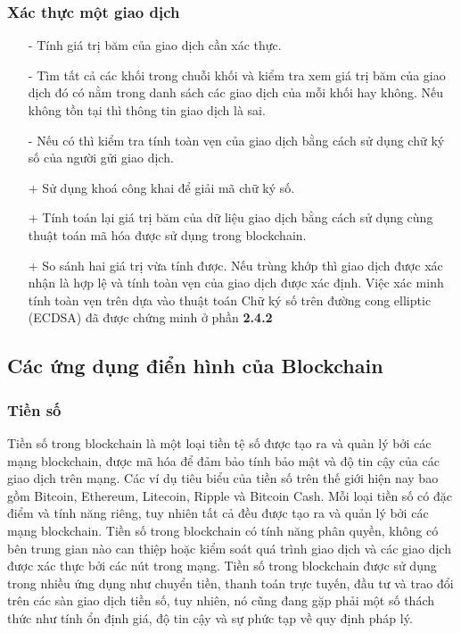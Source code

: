 \subsubsection{Xác thực một giao dịch}
\begin{itemize}
    \item[-] Tính giá trị băm của giao dịch cần xác thực.
    \item[-] Tìm tất cả các khối trong chuỗi khối và kiểm tra xem giá trị băm của giao 
    dịch đó có nằm trong danh sách các giao dịch của mỗi khối hay không.
    Nếu không tồn tại thì thông tin giao dịch là sai.
    \item[-] Nếu có thì kiểm tra tính toàn vẹn của giao dịch bằng cách sử dụng chữ ký số 
    của người gửi giao dịch.
        \item[+] Sử dụng khoá công khai để giải mã chữ ký số.
        \item[+] Tính toán lại giá trị băm của dữ liệu giao dịch bằng cách sử dụng cùng
        thuật toán mã hóa được sử dụng trong blockchain.
        \item[+] So sánh hai giá trị vừa tính được. Nếu trùng khớp thì giao dịch được
        xác nhận là hợp lệ và tính toàn vẹn của giao dịch được xác định.
        Việc xác minh tính toàn vẹn trên dựa vào thuật toán Chữ ký số trên đường cong 
        elliptic (ECDSA) đã được chứng minh ở phần \textbf{2.4.2}
\end{itemize}

\subsection{Các ứng dụng điển hình của Blockchain}
\subsubsection{Tiền số}

Tiền số trong blockchain là một loại tiền tệ số được tạo ra và quản lý bởi các 
mạng blockchain, được mã hóa để đảm bảo tính bảo mật và độ tin cậy của các giao 
dịch trên mạng. Các ví dụ tiêu biểu của tiền số trên thế giới hiện nay bao gồm 
Bitcoin, Ethereum, Litecoin, Ripple và Bitcoin Cash. Mỗi loại tiền số có đặc điểm 
và tính năng riêng, tuy nhiên tất cả đều được tạo ra và quản lý bởi các mạng 
blockchain. Tiền số trong blockchain có tính năng phân quyền, không có bên trung 
gian nào can thiệp hoặc kiểm soát quá trình giao dịch và các giao dịch được xác 
thực bởi các nút trong mạng. Tiền số trong blockchain được sử dụng trong nhiều 
ứng dụng như chuyển tiền, thanh toán trực tuyến, đầu tư và trao đổi trên các sàn 
giao dịch tiền số, tuy nhiên, nó cũng đang gặp phải một số thách thức như tính 
ổn định giá, độ tin cậy và sự phức tạp về quy định pháp lý.

